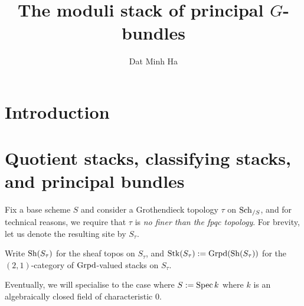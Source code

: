 

\setcounter{section}{-1}





    \title{The moduli stack of principal \texorpdfstring{$G$}{}-bundles}
    
    \author{Dat Minh Ha}
    \maketitle
    
    \begin{abstract}
        
    \end{abstract}
    
    {
      \hypersetup{} 
      \tableofcontents %
    }

    \listoftodos

    \section{Introduction}

    \section{Quotient stacks, classifying stacks, and principal bundles}
        \begin{convention}
            Fix a base scheme $S$ and consider a Grothendieck topology $\tau$ on $\mathrm{Sch}_{/S}$, and for technical reasons, we require that $\tau$ is \textit{no finer than the fpqc topology}. For brevity, let us denote the resulting site by $S_{\tau}$. 

            Write $\mathrm{Sh}(S_{\tau})$ for the sheaf topos on $S_{\tau}$, and $\mathrm{Stk}(S_{\tau}) := \mathrm{Grpd}(\mathrm{Sh}(S_{\tau}))$ for the $(2, 1)$-category of $\mathrm{Grpd}$-valued stacks on $S_{\tau}$. 

            Eventually, we will specialise to the case where $S := \operatorname{Spec} k$ where $k$ is an algebraically closed field of characteristic $0$.
        \end{convention}

